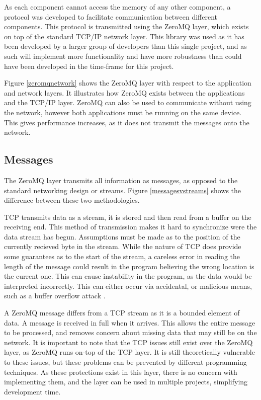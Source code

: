 As each component cannot access the memory of any other component, a protocol was developed to facilitate communication between different components. This protocol is transmitted using the ZeroMQ layer, which exists on top of the standard TCP/IP network layer. This library was used as it has been developed by a larger group of developers than this single project, and as such will implement more functionality and have more robustness than could have been developed in the time-frame for this project.


Figure \ref{zeromqnetwork} shows the ZeroMQ layer with respect to the application and network layers. It illustrates how ZeroMQ exists between the applications and the TCP/IP layer. ZeroMQ can also be used to communicate without using the network, however both applications must be running on the same device. This gives performance increases, as it does not transmit the messages onto the network.

\subsection{Messages}

The ZeroMQ layer transmits all information as messages, as opposed to the standard networking design or streams. Figure \ref{messagesvstreams} shows the difference between these two methodologies.


TCP transmits data as a stream, it is stored and then read from a buffer on the receiving end. This method of transmission makes it hard to synchronize were the data stream has begun. Assumptions must be made as to the position of the currently recieved byte in the stream. While the nature of TCP does provide some  guarantees as to the start of the stream, a careless error in reading the length of the message could result in the program believing the wrong location is the current one. This can cause instability in the program, as the data would be interpreted incorrectly. This can either occur via accidental, or malicious means, such as a buffer overflow attack \cite{bufferoverflow}. 

A ZeroMQ message differs from a TCP stream as it is a bounded element of data. A message is received in full when it arrives. This allows the entire message to be processed, and removes concern about missing data that may still be on the network.  It is important to note that the TCP issues still exist over the ZeroMQ layer, as ZeroMQ runs on-top of the TCP layer. It is still theoretically vulnerable to these issues, but these problems can be prevented by different programming techniques. As these protections exist in this layer, there is no concern with implementing them, and the layer can be used in multiple projects, simplifying development time.


